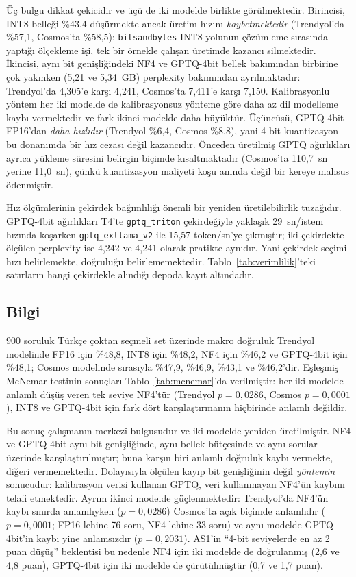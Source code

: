 \documentclass[conference]{IEEEtran}
\begin{document}
Üç bulgu dikkat çekicidir ve üçü de iki modelde birlikte görülmektedir.
Birincisi, INT8 belleği \%43,4 düşürmekte ancak üretim hızını
\emph{kaybetmektedir} (Trendyol'da \%57,1, Cosmos'ta \%58,5);
\texttt{bitsandbytes} INT8 yolunun çözümleme sırasında yaptığı ölçekleme işi,
tek bir örnekle çalışan üretimde kazancı silmektedir. İkincisi, aynı bit
genişliğindeki NF4 ve GPTQ-4bit bellek bakımından birbirine çok yakınken
(5,21 ve 5,34~GB) perplexity bakımından ayrılmaktadır: Trendyol'da 4,305'e
karşı 4,241, Cosmos'ta 7,411'e karşı 7,150. Kalibrasyonlu yöntem her iki
modelde de kalibrasyonsuz yönteme göre daha az dil modelleme kaybı
vermektedir ve fark ikinci modelde daha büyüktür. Üçüncüsü, GPTQ-4bit
FP16'dan \emph{daha hızlıdır} (Trendyol \%6,4, Cosmos \%8,8), yani 4-bit
kuantizasyon bu donanımda bir hız cezası değil kazancıdır. Önceden üretilmiş
GPTQ ağırlıkları ayrıca yükleme süresini belirgin biçimde kısaltmaktadır
(Cosmos'ta 110,7~sn yerine 11,0~sn), çünkü kuantizasyon maliyeti koşu anında
değil bir kereye mahsus ödenmiştir.

Hız ölçümlerinin çekirdek bağımlılığı önemli bir yeniden üretilebilirlik
tuzağıdır. GPTQ-4bit ağırlıkları T4'te \texttt{gptq\_triton} çekirdeğiyle
yaklaşık 29~sn/istem hızında koşarken \texttt{gptq\_exllama\_v2} ile 15,57
token/sn'ye çıkmıştır; iki çekirdekte ölçülen perplexity ise 4,242 ve 4,241
olarak pratikte aynıdır. Yani çekirdek seçimi hızı belirlemekte, doğruluğu
belirlememektedir. Tablo~\ref{tab:verimlilik}'teki satırların hangi çekirdekle
alındığı depoda kayıt altındadır.

\subsection{Bilgi}
\label{sec:bilgi}

900 soruluk Türkçe çoktan seçmeli set üzerinde makro doğruluk Trendyol
modelinde FP16 için \%48,8, INT8 için \%48,2, NF4 için \%46,2 ve GPTQ-4bit
için \%48,1; Cosmos modelinde sırasıyla \%47,9, \%46,9, \%43,1 ve
\%46,2'dir. Eşleşmiş McNemar testinin sonuçları Tablo~\ref{tab:mcnemar}'da
verilmiştir: her iki modelde anlamlı düşüş veren tek seviye NF4'tür
(Trendyol $p=0{,}0286$, Cosmos $p=0{,}0001$), INT8 ve GPTQ-4bit için fark
dört karşılaştırmanın hiçbirinde anlamlı değildir.

Bu sonuç çalışmanın merkezî bulgusudur ve iki modelde yeniden üretilmiştir.
NF4 ve GPTQ-4bit aynı bit genişliğinde, aynı bellek bütçesinde ve aynı sorular
üzerinde karşılaştırılmıştır; buna karşın biri anlamlı doğruluk kaybı
vermekte, diğeri vermemektedir. Dolayısıyla ölçülen kayıp bit genişliğinin
değil \emph{yöntemin} sonucudur: kalibrasyon verisi kullanan GPTQ, veri
kullanmayan NF4'ün kaybını telafi etmektedir. Ayrım ikinci modelde
güçlenmektedir: Trendyol'da NF4'ün kaybı sınırda anlamlıyken
($p=0{,}0286$) Cosmos'ta açık biçimde anlamlıdır ($p=0{,}0001$; FP16 lehine
76 soru, NF4 lehine 33 soru) ve aynı modelde GPTQ-4bit'in kaybı yine
anlamsızdır ($p=0{,}2031$). AS1'in ``4-bit seviyelerde en az 2 puan düşüş''
beklentisi bu nedenle NF4 için iki modelde de doğrulanmış (2,6 ve 4,8 puan),
GPTQ-4bit için iki modelde de çürütülmüştür (0,7 ve 1,7 puan).
\end{document}
